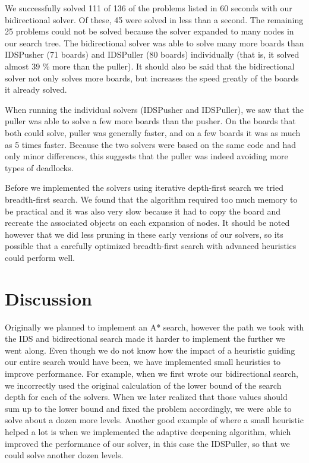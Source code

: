 \documentclass[a4paper,12pt]{article}
\renewcommand{\*}[0]{\cdot}
\begin{document}

We successfully solved 111 of 136 of the problems listed in 60 seconds with our
bidirectional solver. Of these, 45 were solved in less than a second. The
remaining 25 problems could not be solved because the solver expanded to many
nodes in our search tree. The bidirectional solver was able to solve many more
boards than IDSPusher (71 boards) and IDSPuller (80 boards) individually (that
is, it solved almost 39 \% more than the puller). It should also be said that
the bidirectional solver not only solves more boards, but increases the speed
greatly of the boards it already solved.

When running the individual solvers (IDSPusher and IDSPuller), we saw that the
puller was able to solve a few more boards than the pusher. On the boards that
both could solve, puller was generally faster, and on a few boards it was as
much as 5 times faster. Because the two solvers were based on the same code and
had only minor differences, this suggests that the puller was indeed avoiding
more types of deadlocks.

Before we implemented the solvers using iterative depth-first search we tried
breadth-first search. We found that the algorithm required too much memory to be
practical and it was also very slow because it had to copy the board and
recreate the associated objects on each expansion of nodes. It should be noted
however that we did less pruning in these early versions of our solvers, so its
possible that a carefully optimized breadth-first search with advanced
heuristics could perform well.


\part*{Discussion}

Originally we planned to implement an A* search, however the path we took with
the IDS and bidirectional search made it harder to implement the further we went
along. Even though we do not know how the impact of a heuristic guiding our
entire search would have been, we have implemented small heuristics to improve
performance. For example, when we first wrote our bidirectional search, we
incorrectly used the original calculation of the lower bound of the search depth
for each of the solvers. When we later realized that those values should sum up
to the lower bound and fixed the problem accordingly, we were able to solve
about a dozen more levels. Another good example of where a small heuristic
helped a lot is when we implemented the adaptive deepening algorithm, which
improved the performance of our solver, in this case the IDSPuller, so that we
could solve another dozen levels.
\end{document}
